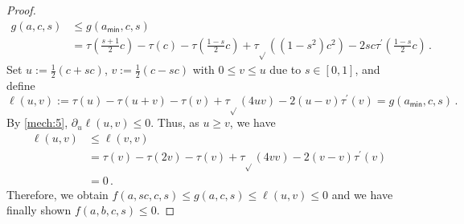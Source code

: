 \documentclass{article}
\newcommand*{\ms}[1]{\mathsf{#1}}
\newcommand{\pr}{^\prime}
\newcommand{\equationFullstop}{\, .}
\newcommand{\eqfs}{\equationFullstop}
\newcommand{\tran}{\tau}
\newcommand{\trans}{\tran_{\!\sqrt{}}}
\newcommand{\dtran}{\tran\pr}
\begin{document}
\begin{appendix}
\begin{proof}
	\begin{align*}
		g(a,c,s)  
		&\leq 
		g(a_{\ms{min}},c,s)
		\\&= 
		\tran(\frac{s+1}{2}c)-\tran(c)-\tran(\frac{1-s}{2}c)+\trans((1-s^2)c^2) - 2 sc\dtran(\frac{1-s}{2}c)
		\eqfs
	\end{align*}
	Set $u := \frac12(c+sc)$, $v := \frac12(c-sc)$ with $0\leq v \leq u$  due to $s \in[0,1]$, and define
	\begin{equation}
		\ell(u, v)  :=  \tran(u)-\tran(u+v)-\tran(v)+\trans(4uv) - 2 (u-v)\dtran(v) = g(a_{\ms{min}},c,s)
		\eqfs
	\end{equation}
	By \cref{mech:5}, $\partial_u \ell(u, v) \leq 0$. Thus, as $u \geq v$, we have 
	\begin{align*}
		\ell(u, v)  
		&\leq 
		\ell(v, v) 
		\\&= 
		\tran(v)-\tran(2v)-\tran(v)+\trans(4vv) - 2(v-v)\dtran(v) 
		\\&= 0
		\eqfs
	\end{align*}
	Therefore, we obtain $f(a,sc,c,s) \leq g(a,c,s) \leq \ell(u, v) \leq 0$ and we have finally shown $f(a,b,c,s) \leq 0$.
\end{proof}
%
%
%

\end{appendix}
\end{document}
